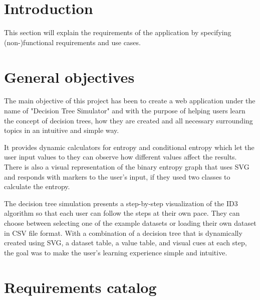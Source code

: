 
\section{Introduction}
This section will explain the requirements of the application by specifying (non-)functional requirements and use cases.

\section{General objectives}
The main objective of this project has been to create a web application under the name of "Decision Tree Simulator" and with the purpose of helping users learn the concept of decision trees, how they are created and all necessary surrounding topics in an intuitive and simple way.

It provides dynamic calculators for entropy and conditional entropy which let the user input values to they can observe how different values affect the results. There is also a visual representation of the binary entropy graph that uses SVG and responds with markers to the user's input, if they used two classes to calculate the entropy.

The decision tree simulation presents a step-by-step visualization of the ID3 algorithm so that each user can follow the steps at their own pace. They can choose between selecting one of the example datasets or loading their own dataset in CSV file format. With a combination of a decision tree that is dynamically created using SVG, a dataset table, a value table, and visual cues at each step, the goal was to make the user's learning experience simple and intuitive.

\section{Requirements catalog}
